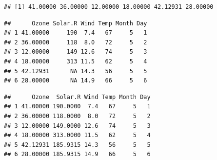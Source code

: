 \documentclass[]{article}
\newenvironment{Shaded}{\begin{snugshade}}{\end{snugshade}}
\newcommand{\DataTypeTok}[1]{\textcolor[rgb]{0.13,0.29,0.53}{#1}}
\newcommand{\KeywordTok}[1]{\textcolor[rgb]{0.13,0.29,0.53}{\textbf{#1}}}
\newcommand{\NormalTok}[1]{#1}
\newcommand{\OperatorTok}[1]{\textcolor[rgb]{0.81,0.36,0.00}{\textbf{#1}}}
\newcommand{\StringTok}[1]{\textcolor[rgb]{0.31,0.60,0.02}{#1}}
\theoremstyle{definition}
\theoremstyle{definition}
\theoremstyle{definition}
\theoremstyle{remark}
\begin{document}
\begin{Shaded}
\end{Shaded}

\begin{verbatim}
## [1] 41.00000 36.00000 12.00000 18.00000 42.12931 28.00000
\end{verbatim}

\begin{Shaded}
\end{Shaded}

\begin{verbatim}
##      Ozone Solar.R Wind Temp Month Day
## 1 41.00000     190  7.4   67     5   1
## 2 36.00000     118  8.0   72     5   2
## 3 12.00000     149 12.6   74     5   3
## 4 18.00000     313 11.5   62     5   4
## 5 42.12931      NA 14.3   56     5   5
## 6 28.00000      NA 14.9   66     5   6
\end{verbatim}

\begin{Shaded}
\end{Shaded}

\begin{verbatim}
##      Ozone  Solar.R Wind Temp Month Day
## 1 41.00000 190.0000  7.4   67     5   1
## 2 36.00000 118.0000  8.0   72     5   2
## 3 12.00000 149.0000 12.6   74     5   3
## 4 18.00000 313.0000 11.5   62     5   4
## 5 42.12931 185.9315 14.3   56     5   5
## 6 28.00000 185.9315 14.9   66     5   6
\end{verbatim}

\begin{Shaded}
\end{Shaded}
\end{document}
